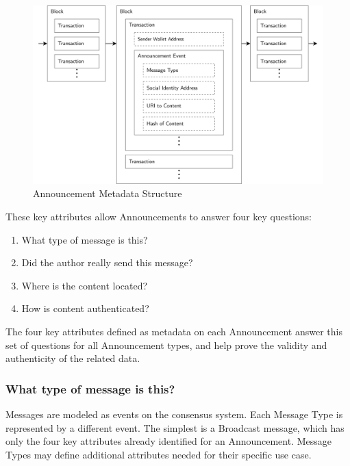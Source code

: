 \documentclass[12pt,letterpaper]{article}
\providecommand{\tightlist}{%
\setlength{\itemsep}{0pt}\setlength{\parskip}{0pt}}
\begin{document}
\begin{figure}
	\includegraphics[width=\linewidth]{figures/Announcement Metadata Structure.png}
	\caption{Announcement Metadata Structure}
	\label{fig:5}
\end{figure}

\begin{samepage}
	These key attributes allow Announcements to answer four key questions:

	\begin{enumerate}
		\tightlist
		\item
		      What type of message is this?
		\item
		      Did the author really send this message?
		\item
		      Where is the content located?
		\item
		      How is content authenticated?
	\end{enumerate}
\end{samepage}

The four key attributes defined as metadata on each Announcement answer this set of
questions for all Announcement types, and help prove the validity and authenticity of the
related data.

\subsubsection{What type of message is this?}

Messages are modeled as events on the consensus system. Each Message Type is represented by
a different event. The simplest is a Broadcast message, which has only the four key
attributes already identified for an Announcement. Message Types may define additional
attributes needed for their specific use case.
\end{document}
